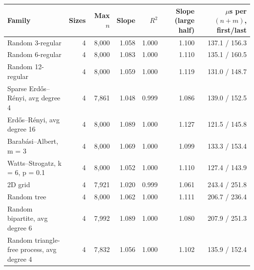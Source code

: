 \begin{tabular}{lrrrrrr}
\toprule
Family & Sizes & Max $n$ & Slope & $R^2$ & Slope (large half) & $\mu$s per $(n+m)$, first/last \\
\midrule
Random 3-regular & 4 & 8{,}000 & 1.058 & 1.000 & 1.100 & 137.1 / 156.3 \\
Random 6-regular & 4 & 8{,}000 & 1.083 & 1.000 & 1.110 & 135.1 / 160.5 \\
Random 12-regular & 4 & 8{,}000 & 1.059 & 1.000 & 1.119 & 131.0 / 148.7 \\
Sparse Erd\H{o}s--R\'enyi, avg degree 4 & 4 & 7{,}861 & 1.048 & 0.999 & 1.086 & 139.0 / 152.5 \\
Erd\H{o}s--R\'enyi, avg degree 16 & 4 & 8{,}000 & 1.089 & 1.000 & 1.127 & 121.5 / 145.8 \\
Barab\'asi--Albert, m = 3 & 4 & 8{,}000 & 1.069 & 1.000 & 1.099 & 133.3 / 153.4 \\
Watts--Strogatz, k = 6, p = 0.1 & 4 & 8{,}000 & 1.052 & 1.000 & 1.110 & 127.4 / 143.9 \\
2D grid & 4 & 7{,}921 & 1.020 & 0.999 & 1.061 & 243.4 / 251.8 \\
Random tree & 4 & 8{,}000 & 1.062 & 1.000 & 1.111 & 206.7 / 236.4 \\
Random bipartite, avg degree 6 & 4 & 7{,}992 & 1.089 & 1.000 & 1.080 & 207.9 / 251.3 \\
Random triangle-free process, avg degree 4 & 4 & 7{,}832 & 1.056 & 1.000 & 1.102 & 135.9 / 152.4 \\
\bottomrule
\end{tabular}
